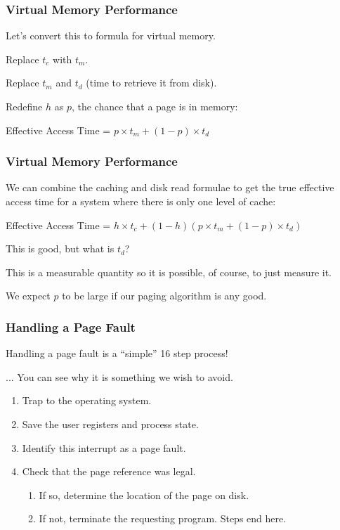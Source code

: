 \begin{frame}
\frametitle{Virtual Memory Performance}

Let's convert this to formula for virtual memory.

Replace $t_{c}$ with $t_{m}$.

Replace $t_{m}$ and $t_{d}$ (time to retrieve it from disk).

Redefine $h$ as $p$, the chance that a page is in memory:

\begin{center}
	Effective Access Time = $ p \times t_{m} + (1 - p) \times t_{d}$
\end{center}

\end{frame}



\begin{frame}
\frametitle{Virtual Memory Performance}

We can combine the caching and disk read formulae to get the true effective access time for a system where there is only one level of cache:

\begin{center}
	Effective Access Time = $ h \times t_{c} + (1 - h) ( p \times t_{m} + (1 - p) \times t_{d})$
\end{center}

This is good, but what is $t_{d}$? 

This is a measurable quantity so it is possible, of course, to just measure it.

We expect $p$ to be large if our paging algorithm is any good.

\end{frame}



\begin{frame}
\frametitle{Handling a Page Fault}

Handling a page fault is a ``simple'' 16 step process!

... You can see why it is something we wish to avoid.

\begin{enumerate}
	\item Trap to the operating system.
	\item Save the user registers and process state.
	\item Identify this interrupt as a page fault.
	\item Check that the page reference was legal. 
	\begin{enumerate}
		\item If so, determine the location of the page on disk.
		\item If not, terminate the requesting program. Steps end here.
	\end{enumerate}
	\setcounter{pf}{\theenumi}
\end{enumerate}

\end{frame}

